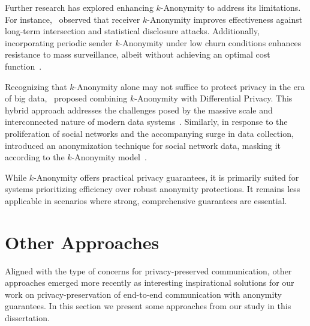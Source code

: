 Further research has explored enhancing \(k\)-Anonymity to address its limitations. For instance,~\citeauthor{kAnonymityEffectiveness} observed that receiver \(k\)-Anonymity improves effectiveness against long-term intersection and statistical disclosure attacks. Additionally, incorporating periodic sender \(k\)-Anonymity under low churn conditions enhances resistance to mass surveillance, albeit without achieving an optimal cost function~\cite{kAnonymityEffectiveness}.

Recognizing that \(k\)-Anonymity alone may not suffice to protect privacy in the era of big data,~\citeauthor{BigdataKAnon} proposed combining \(k\)-Anonymity with Differential Privacy. This hybrid approach addresses the challenges posed by the massive scale and interconnected nature of modern data systems~\cite{BigdataKAnon}. Similarly, in response to the proliferation of social networks and the accompanying surge in data collection,~\citeauthor{CAMPAN} introduced an anonymization technique for social network data, masking it according to the \(k\)-Anonymity model~\cite{CAMPAN}.

While \(k\)-Anonymity offers practical privacy guarantees, it is primarily suited for systems prioritizing efficiency over robust anonymity protections. It remains less applicable in scenarios where strong, comprehensive guarantees are essential.

\section{Other Approaches}

Aligned with the type of concerns for privacy-preserved communication, other approaches emerged more recently as interesting inspirational solutions for our work on privacy-preservation of end-to-end communication with anonymity guarantees. In this section we present some approaches from our study in this dissertation.

